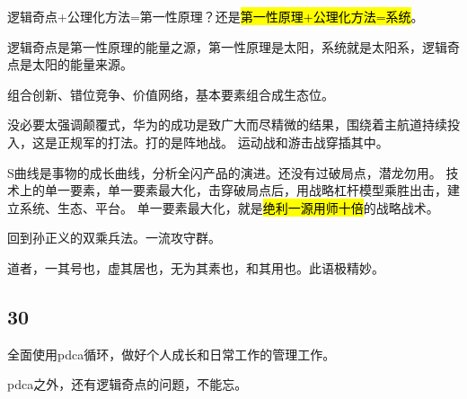 逻辑奇点+公理化方法=第一性原理？还是\hl{第一性原理+公理化方法=系统}。

逻辑奇点是第一性原理的能量之源，第一性原理是太阳，系统就是太阳系，逻辑奇点是太阳的能量来源。

组合创新、错位竞争、价值网络，基本要素组合成生态位。

没必要太强调颠覆式，华为的成功是致广大而尽精微的结果，围绕着主航道持续投入，这是正规军的打法。打的是阵地战。
运动战和游击战穿插其中。

S曲线是事物的成长曲线，分析全闪产品的演进。还没有过破局点，潜龙勿用。
技术上的单一要素，单一要素最大化，击穿破局点后，用战略杠杆模型乘胜出击，建立系统、生态、平台。
单一要素最大化，就是\hl{绝利一源用师十倍}的战略战术。

回到孙正义的双乘兵法。一流攻守群。

道者，一其号也，虚其居也，无为其素也，和其用也。此语极精妙。

\subsection{30}

全面使用pdca循环，做好个人成长和日常工作的管理工作。

pdca之外，还有逻辑奇点的问题，不能忘。

